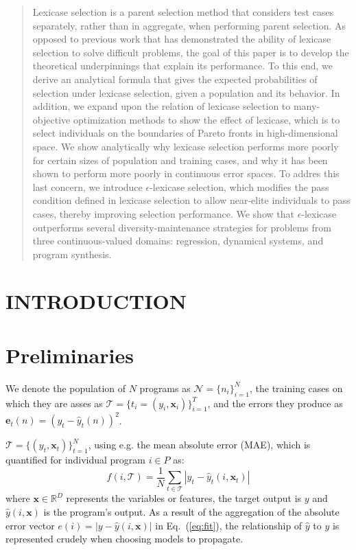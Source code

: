 \documentclass[preprint]{article}
\begin{document}
\maketitle
\begin{abstract}
Lexicase selection is a parent selection method that considers test cases separately, rather than in aggregate, when performing parent selection. As opposed to previous work that has demonstrated the ability of lexicase selection to solve difficult problems, the goal of this paper is to develop the theoretical underpinnings that explain its performance. To this end, we derive an analytical formula that gives the expected probabilities of selection under lexicase selection, given a population and its behavior. In addition, we expand upon the relation of lexicase selection to many-objective optimization methods to show the effect of lexicase, which is to select individuals on the boundaries of Pareto fronts in high-dimensional space. We show analytically why lexicase selection performs more poorly for certain sizes of population and training cases, and why it has been shown to perform more poorly in continuous error spaces. To addres this last concern, we introduce $\epsilon$-lexicase selection, which modifies the pass condition defined in lexicase selection to allow near-elite individuals to pass cases, thereby improving selection performance. We show that $\epsilon$-lexicase outperforms several diversity-maintenance strategies for problems from three continuous-valued domains: regression, dynamical systems, and program synthesis.
\end{abstract}


\section{INTRODUCTION}
  


\section{Preliminaries}
We denote the population of $N$ programs as $\mathcal{N} = \{n_i\}_{i=1}^N$, the training cases on which they are asses as $\mathcal{T} = \{t_i = (y_i,\mathbf{x}_i)\}_{i=1}^T$, and the errors they produce as $\mathbf{e}_t(n) = (y_t - \hat{y}_t(n))^2$.  

$\mathcal{T} = \{ (y_t,\mathbf{x}_t)\}_{t = 1}^N$, using e.g. the mean absolute error (MAE), which is quantified for individual program $i \in P$ as:
\begin{equation}
f(i,\mathcal{T}) = \frac{1}{N} \sum_{t \in \mathcal{T}}{|y_t - \hat{y}_t(i,\mathbf{x}_t)|} \label{eq:fit} 
\end{equation}
where $\mathbf{x} \in \mathbb{R}^D$ represents the variables or features, the target output is $y$ and $\hat{y}(i,\mathbf{x})$ is the program's output. As a result of the aggregation of the absolute error vector $e(i) = |y - \hat{y}(i,\mathbf{x})|$ in Eq.~(\ref{eq:fit}), the relationship of $\hat{y}$ to $y$ is represented crudely when choosing models to propagate.
\end{document}
